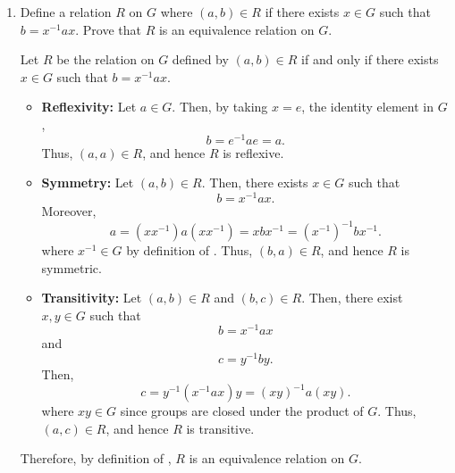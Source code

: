 \begin{enumerate}
  \newpage
  \item Define a relation $R$ on $G$ where $(a, b) \in R$ if 
  there exists $x \in G$ such that $b=x^{-1} a x$. 
  Prove that $R$ is an equivalence relation on $G$.
  \begin{subprove}
    Let $R$ be the relation on $G$ defined by 
    $(a, b) \in R$ if and only if there exists $x \in G$ such that $b = x^{-1} a x$.
    \begin{itemize}
      \item \textbf{Reflexivity:} 
        Let $a \in G$. 
        Then, by taking $x = e$, the identity element in $G$,
        \[
          b = e^{-1} a e = a.
        \]
        Thus, $(a, a) \in R$, and hence $R$ is reflexive.
      \item \textbf{Symmetry:} 
        Let $(a, b) \in R$. 
        Then, there exists $x \in G$ such that
        \[
          b = x^{-1} a x.
        \]
        Moreover,
        \[
          a = (x x^{-1}) a (x x^{-1}) = x b x^{-1} = (x^{-1})^{-1} b x^{-1}.
        \]
        where $x^{-1} \in G$ by definition of . 
        Thus, $(b, a) \in R$, and hence $R$ is symmetric.
      \item \textbf{Transitivity:} 
        Let $(a, b) \in R$ and $(b, c) \in R$. 
        Then, there exist $x, y \in G$ such that
        \[
          b = x^{-1} a x
        \]
        and
        \[
          c = y^{-1} b y.
        \]
        Then, 
        \[
          c = y^{-1} (x^{-1} a x) y = (x y)^{-1} a (x y).
        \]
        where $xy\in G$ since groups are closed under the product of $G$.
        Thus, $(a, c) \in R$, and hence $R$ is transitive.
    \end{itemize}
    Therefore, by definition of , $R$ is an equivalence relation on $G$.
  \end{subprove}












\end{enumerate}

